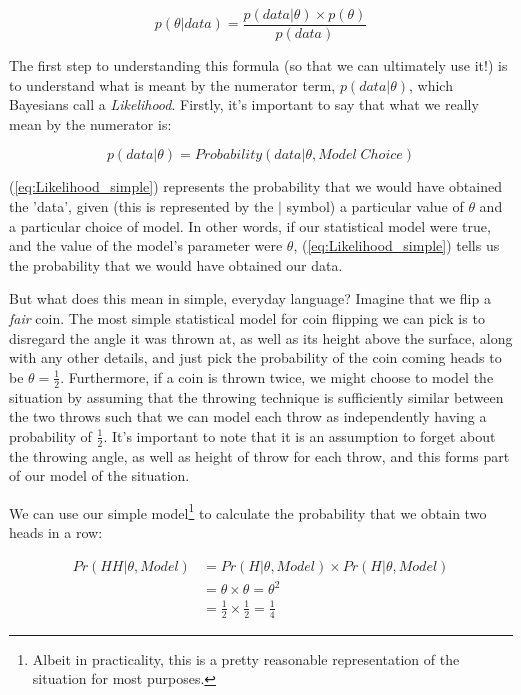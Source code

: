 \documentclass[11pt,fullpage]{book}
\begin{document}
\begin{equation}
p(\theta|data) = \frac{p(data|\theta)\times p(\theta)}{p(data)}
\end{equation}\label{eq:Likelihood_Bayes}

The first step to understanding this formula (so that we can ultimately use it!) is to understand what is meant by the numerator term, $p(data|\theta)$, which Bayesians call a \textit{Likelihood}. Firstly, it's important to say that what we really mean by the numerator is:

\begin{equation}
p(data|\theta) = Probability(data|\theta,Model \; Choice)
\end{equation}\label{eq:Likelihood_simple}

(\ref{eq:Likelihood_simple}) represents the probability that we would have obtained the 'data', given (this is represented by the $|$ symbol) a particular value of $\theta$ and a particular choice of model. In other words, if our statistical model were true, and the value of the model's parameter were $\theta$, (\ref{eq:Likelihood_simple}) tells us the probability that we would have obtained our data. 

But what does this mean in simple, everyday language? Imagine that we flip a \textit{fair} coin. The most simple statistical model for coin flipping we can pick is to disregard the angle it was thrown at, as well as its height above the surface, along with any other details, and just pick the probability of the coin coming heads to be $\theta=\frac{1}{2}$. Furthermore, if a coin is thrown twice, we might choose to model the situation by assuming that the throwing technique is sufficiently similar between the two throws such that we can model each throw as independently having a probability of $\frac{1}{2}$. It's important to note that it is an assumption to forget about the throwing angle, as well as height of throw for each throw, and this forms part of our model of the situation. 

We can use our simple model\footnote{Albeit in practicality, this is a pretty reasonable representation of the situation for most purposes.} to calculate the probability that we obtain two heads in a row:


\begin{align}\label{eq:Likelihood_fairCoin}
Pr(HH|\theta,Model) &= Pr(H|\theta,Model)\times Pr(H|\theta,Model)\\
&= \theta \times \theta = \theta^2\\ 
&= \frac{1}{2}\times \frac{1}{2} = \frac{1}{4}
\end{align}
\end{document}
